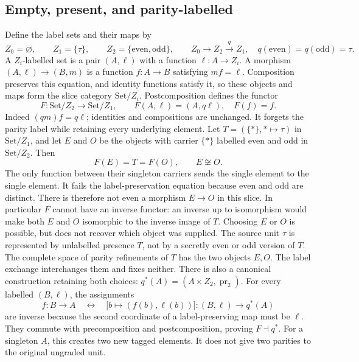 \subsection{Empty, present, and parity-labelled}
Define the label sets and their maps by
\begin{equation}\tag{PPI1}
Z_0=\varnothing,\qquad Z_1=\{\tau\},\qquad
Z_2=\{\mathrm{even},\mathrm{odd}\},\qquad
Z_0\longrightarrow Z_2\xrightarrow{q}Z_1,
\quad q(\mathrm{even})=q(\mathrm{odd})=\tau.
\end{equation}
A $Z_i$-labelled set is a pair $(A,\ell)$ with a function
$\ell:A\to Z_i$. A morphism $(A,\ell)\to(B,m)$ is a function
$f:A\to B$ satisfying $m f=\ell$. Composition preserves this
equation, and identity functions satisfy it, so these objects
and maps form the slice category $\mathrm{Set}/Z_i$.
Postcomposition defines the functor
\begin{equation}\tag{PPI2}
F:\mathrm{Set}/Z_2\longrightarrow\mathrm{Set}/Z_1,
\qquad F(A,\ell)=(A,q\ell),\quad F(f)=f.
\end{equation}
Indeed $(qm)f=q\ell$; identities and compositions are unchanged.
It forgets the parity label while retaining every underlying element.
Let $T=(\{*\},*\mapsto\tau)$ in $\mathrm{Set}/Z_1$, and let
$E$ and $O$ be the objects with carrier $\{*\}$ labelled even and odd in
$\mathrm{Set}/Z_2$. Then
\begin{equation}\tag{PPI3}
F(E)=T=F(O),\qquad E\not\cong O.
\end{equation}
The only function between their singleton carriers sends the single
element to the single element. It fails the label-preservation
equation because even and odd are distinct. There is therefore not
even a morphism $E\to O$ in this slice. In particular $F$ cannot
have an inverse functor: an inverse up to isomorphism would make
both $E$ and $O$ isomorphic to the inverse image of $T$.
Choosing $E$ or $O$ is possible, but does not recover which object
was supplied. The source unit $\tau$ is represented by unlabelled
presence $T$, not by a secretly even or odd version of $T$.
The complete space of parity refinements of $T$ has the two
objects $E,O$. The label exchange interchanges them and fixes
neither. There is also a canonical construction retaining both
choices: $q^*(A)=(A\times Z_2,\operatorname{pr}_2)$. For every
labelled $(B,\ell)$, the assignments
\[
f:B\to A\quad\longleftrightarrow\quad
\bigl[b\mapsto(f(b),\ell(b))\bigr]:
(B,\ell)\to q^*(A)
\]
are inverse because the second coordinate of a label-preserving
map must be $\ell$. They commute with precomposition and
postcomposition, proving $F\dashv q^*$. For a singleton $A$,
this creates two new tagged elements. It does not give two
parities to the original ungraded unit.

